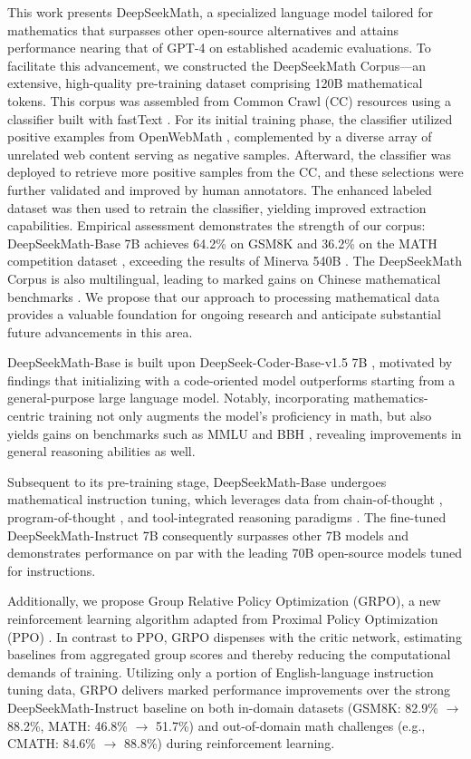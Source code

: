 This work presents DeepSeekMath, a specialized language model tailored for mathematics that surpasses other open-source alternatives and attains performance nearing that of GPT-4 on established academic evaluations. To facilitate this advancement, we constructed the DeepSeekMath Corpus—an extensive, high-quality pre-training dataset comprising 120B mathematical tokens. This corpus was assembled from Common Crawl (CC) resources using a classifier built with fastText \citep{joulin2016fasttext}. For its initial training phase, the classifier utilized positive examples from OpenWebMath \citep{openwebmath}, complemented by a diverse array of unrelated web content serving as negative samples. Afterward, the classifier was deployed to retrieve more positive samples from the CC, and these selections were further validated and improved by human annotators. The enhanced labeled dataset was then used to retrain the classifier, yielding improved extraction capabilities. Empirical assessment demonstrates the strength of our corpus: DeepSeekMath-Base 7B achieves 64.2\% on GSM8K \citep{gsm8k} and 36.2\% on the MATH competition dataset \citep{MATH}, exceeding the results of Minerva 540B \citep{minerva}. The DeepSeekMath Corpus is also multilingual, leading to marked gains on Chinese mathematical benchmarks \citep{wei2023cmath,agieval}. We propose that our approach to processing mathematical data provides a valuable foundation for ongoing research and anticipate substantial future advancements in this area.

DeepSeekMath-Base is built upon DeepSeek-Coder-Base-v1.5 7B \citep{deepseek-coder}, motivated by findings that initializing with a code-oriented model outperforms starting from a general-purpose large language model. Notably, incorporating mathematics-centric training not only augments the model’s proficiency in math, but also yields gains on benchmarks such as MMLU \citep{mmlu} and BBH \citep{bbh}, revealing improvements in general reasoning abilities as well.

Subsequent to its pre-training stage, DeepSeekMath-Base undergoes mathematical instruction tuning, which leverages data from chain-of-thought \citep{cot}, program-of-thought \citep{pot,pal}, and tool-integrated reasoning paradigms \citep{tora}. The fine-tuned DeepSeekMath-Instruct 7B consequently surpasses other 7B models and demonstrates performance on par with the leading 70B open-source models tuned for instructions.

Additionally, we propose Group Relative Policy Optimization (GRPO), a new reinforcement learning algorithm adapted from Proximal Policy Optimization (PPO) \citep{schulman2017proximal}. In contrast to PPO, GRPO dispenses with the critic network, estimating baselines from aggregated group scores and thereby reducing the computational demands of training. Utilizing only a portion of English-language instruction tuning data, GRPO delivers marked performance improvements over the strong DeepSeekMath-Instruct baseline on both in-domain datasets (GSM8K: 82.9\% $\rightarrow$ 88.2\%, MATH: 46.8\% $\rightarrow$ 51.7\%) and out-of-domain math challenges (e.g., CMATH: 84.6\% $\rightarrow$ 88.8\%) during reinforcement learning.

